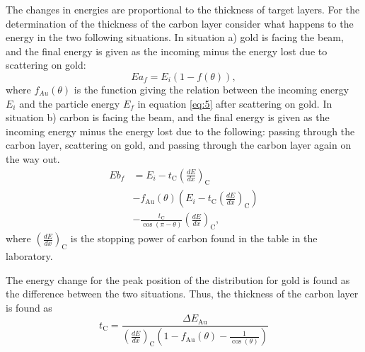 The changes in energies are proportional to the thickness of target layers. For the determination of the thickness of the carbon layer consider what happens to the energy in the two following situations. In situation a) gold is facing the beam, and the final energy is given as the incoming minus the energy lost due to scattering on gold:
\begin{equation*}
Ea_f = E_i (1-f(\theta)), 
\end{equation*}
where $f_{Au}(\theta)$ is the function giving the relation between the incoming energy $E_i$ and the particle energy $E_f$ in equation \cref{eq:5} after scattering on gold. 
In situation b) carbon is facing the beam, and the final energy is given as the incoming energy minus the energy lost due to the following: passing through the carbon layer, scattering on gold, and passing through the carbon layer again on the way out. 
\begin{align*}
Eb_f &= E_i - t_\mathrm{C} \left(\frac{dE}{dx}\right)_\mathrm{C} 
\\ &- f_\mathrm{Au}(\theta) \left(E_i - t_\mathrm{C} \left(\frac{dE}{dx}\right)_\mathrm{C} \right) \\ &- \frac{t_\mathrm{C}}{\cos(\pi-\theta)} \left(\frac{dE}{dx}\right)_\mathrm{C}, 
\end{align*}
where $\left(\frac{dE}{dx}\right)_\mathrm{C}$ is the stopping power of carbon found in the table in the laboratory.

The energy change for the peak position of the distribution for gold is found as the difference between the two situations. Thus, the thickness of the carbon layer is found as 
\begin{equation}
t_\mathrm{C} = \frac{\Delta E_{\mathrm{Au}}}{\left(\frac{dE}{dx}\right)_\mathrm{C} \left(1 - f_\mathrm{Au}(\theta) - \frac{1}{\cos(\theta)} \right)}
\end{equation}






